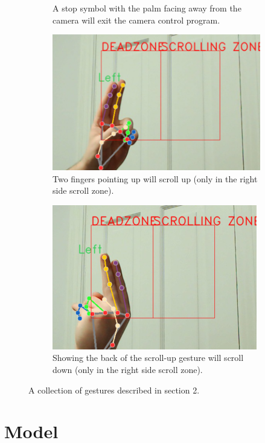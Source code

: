 \documentclass{article}
\begin{document}
\begin{figure}
\begin{subfigure}[T]{0.3\textwidth}
        \caption{A stop symbol with the palm facing away from the camera will exit the camera control program.}
    \end{subfigure}\hfill
    \begin{subfigure}[T]{0.3\textwidth}
        \centering
        \includegraphics[width=.8\linewidth]{two_up.png}
        \caption{Two fingers pointing up will scroll up (only in the right side scroll zone).}
    \end{subfigure}\hfill
    \begin{subfigure}[T]{0.3\textwidth}
        \centering
        \includegraphics[width=.8\linewidth]{two_up_inverted.png}
        \caption{Showing the back of the scroll-up gesture will scroll down (only in the right side scroll zone).}
    \end{subfigure}
    \caption{A collection of gestures described in section 2.}
    \label{fig:gestures}
\end{figure}


\section{Model}
\end{document}
